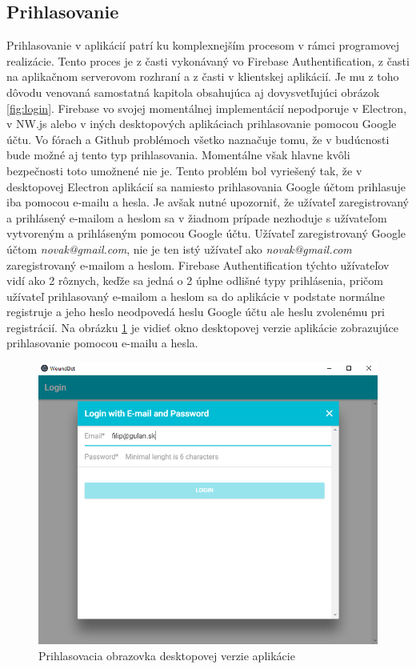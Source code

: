 \subsection{Prihlasovanie}
Prihlasovanie v aplikácií patrí ku komplexnejším procesom v rámci programovej realizácie. Tento proces je z časti vykonávaný vo Firebase Authentification, z časti na aplikačnom serverovom rozhraní a z časti v klientskej aplikácií. Je mu z toho dôvodu venovaná samostatná kapitola obsahujúca aj dovysvetľujúci obrázok \ref{fig:login}. Firebase vo svojej momentálnej implementácií nepodporuje v Electron, v NW.js alebo v iných desktopových aplikáciach prihlasovanie pomocou Google účtu. Vo fórach a Github problémoch všetko naznačuje tomu, že v budúcnosti bude možné aj tento typ prihlasovania. Momentálne však hlavne kvôli bezpečnosti toto umožnené nie je. Tento problém bol vyriešený tak, že v desktopovej Electron aplikácií sa namiesto prihlasovania Google účtom prihlasuje iba pomocou e-mailu a hesla. Je avšak nutné upozorniť, že užívateľ zaregistrovaný a prihlásený e-mailom a heslom sa v žiadnom prípade nezhoduje s užívateľom vytvoreným a prihláseným pomocou Google účtu. Užívateľ zaregistrovaný Google účtom \textit{novak@gmail.com}, nie je ten istý užívateľ ako \textit{novak@gmail.com} zaregistrovaný e-mailom a heslom. Firebase Authentification týchto užívateľov vidí ako 2 rôznych, keďže sa jedná o 2 úplne odlišné typy prihlásenia, pričom užívateľ prihlasovaný e-mailom a heslom sa do aplikácie v podstate normálne registruje a jeho heslo neodpovedá heslu Google účtu ale heslu zvolenému pri registrácií. Na obrázku \ref{fig:electron-app} je vidieť okno desktopovej verzie aplikácie zobrazujúce prihlasovanie pomocou e-mailu a hesla.
\begin{figure}[h]
  \centering
  \includegraphics[scale=0.5]{fig/electron.png}
  \caption{Prihlasovacia obrazovka desktopovej verzie aplikácie}
  \label{fig:electron-app}
\end{figure}

